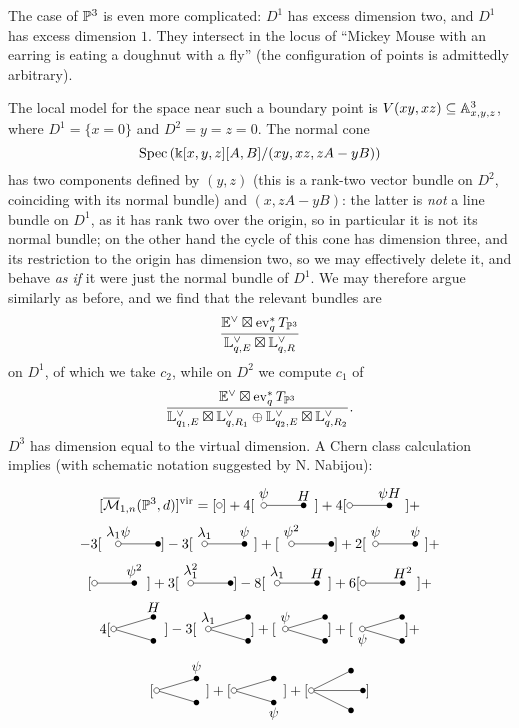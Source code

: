 The case of $\mathbb P^3$ is even more complicated: $D^1$ has excess dimension two, and $D^1$ has excess dimension $1$. They intersect in the locus of ``Mickey Mouse with an earring is eating a doughnut with a fly'' (the configuration of points is admittedly arbitrary).
\begin{figure}[h]
\end{figure}
The local model for the space near such a boundary point is $V(xy,xz)\subseteq\mathbb{A}^3_{x,y,z}$, where $D^1=\{x=0\}$ and $D^2={y=z=0}$. The normal cone \[\operatorname{Spec}\left(\Bbbk[x,y,z][A,B]/(xy,xz,zA-yB)\right)\] has two components defined by $(y,z)$ (this is a rank-two vector bundle on $D^2$, coinciding with its normal bundle) and $(x,zA-yB)$: the latter is \emph{not} a line bundle on $D^1$, as it has rank two over the origin, so in particular it is not its normal bundle; on the other hand the cycle of this cone has dimension three, and its restriction to the origin has dimension two, so we may effectively delete it, and behave \emph{as if} it were just the normal bundle of $D^1$. We may therefore argue similarly as before, and we find that the relevant bundles are \[\frac{\mathbb E^\vee\boxtimes \operatorname{ev}_q^*T_{\mathbb P^3}}{\mathbb L^\vee_{q,E}\boxtimes \mathbb L^\vee_{q,R}}\]
on $D^1$, of which we take $c_2$, while on $D^2$ we compute $c_1$ of \[\frac{\mathbb E^\vee\boxtimes \operatorname{ev}_q^*T_{\mathbb P^3}}{\mathbb L^\vee_{q_1,E}\boxtimes \mathbb L^\vee_{q,R_1}\oplus\mathbb L^\vee_{q_2,E}\boxtimes \mathbb L^\vee_{q,R_2}}.\]
$D^3$ has dimension equal to the virtual dimension. A Chern class calculation implies (with schematic notation suggested by N. Nabijou):
\begin{multline*}
 \virt{\M{1}{n}{\PP^3}{d}}=[\reduced]+ 4[\Dunouno]+4[\Dunodue]+\\
 -3[\Dunotre]-3[\Dunoquat]+[\Dunocin]+2[\Dunosei]+\\
 [\Dunoset]+3[\Dunoott]-8[\Dunonov]+6[\Dunodiec]+\\
 4[\Ddueuno]-3[\Dduedue]+[\Dduetre]+[\Dduequat]+\\
 [\Dduecin]+[\Dduesei]+[\Dtre]
\end{multline*}
